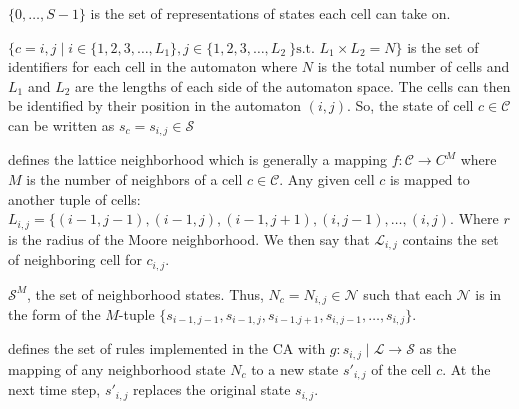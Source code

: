 \begin{CAdef}
    \itemS $\lbrace 0, \dots, S-1 \rbrace$ is the set of representations of states each cell can take on.
    
    \itemC $\lbrace c = {i,j} \mid i \in \lbrace 1,2,3,\dots,L_1 \rbrace, j \in \lbrace 1,2,3,\dots,L_2\ \rbrace \text{s.t. } L_1 \times L_2 = N \rbrace$ is the set of identifiers for each cell in the automaton where $N$ is the total number of cells and $L_1$ and $L_2$ are the lengths of each side of the automaton space. The cells can then be identified by their position in the automaton $(i,j)$. So, the state of cell $c \in \mathcal{C}$ can be written as $s_c = s_{i,j} \in \mathcal{S}$
    
    \itemL defines the lattice neighborhood which is generally a mapping $f : \mathcal{C} \rightarrow C^M$ where $M$ is the number of neighbors of a cell $c \in \mathcal{C}$. Any given cell $c$ is mapped to another tuple of cells: $L_{i,j} = \lbrace (i-1,j-1), (i-1, j), (i-1, j+1), (i, j-1), \dots, (i,j)$. Where $r$ is the radius of the Moore neighborhood. We then say that $\mathcal{L}_{i,j}$ contains the set of neighboring cell for $c_{i,j}$.
    
    \itemN $\mathcal{S}^M$, the set of neighborhood states. Thus, $N_c = N_{i,j} \in \mathcal{N}$ such that each $\mathcal{N}$ is in the form of the $M$-tuple $\lbrace s_{i-1,j-1}, s_{i-1, j}, s_{i-1. j+1}, s_{i, j-1}, \dots, s_{i,j} \rbrace$.
    
    \itemR defines the set of rules implemented in the CA with $g : s_{i,j} \mid \mathcal{L} \rightarrow \mathcal{S}$ as the mapping of any neighborhood state $N_c$ to a new state $s'_{i,j}$ of the cell $c$. At the next time step, $s'_{i,j}$ replaces the original state $s_{i,j}$.
\end{CAdef}




